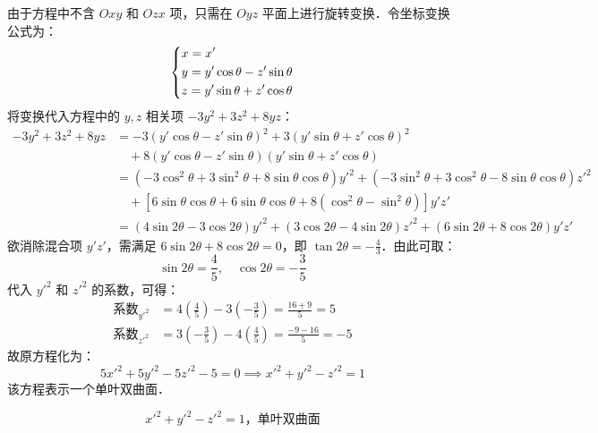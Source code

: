 \begin{solution}
    由于方程中不含 $Oxy$ 和 $Ozx$ 项，只需在 $Oyz$ 平面上进行旋转变换．令坐标变换公式为：
    \begin{equation}
        \begin{dcases}
            x = x'                              \\
            y = y' \cos \theta - z' \sin \theta \\
            z = y' \sin \theta + z' \cos \theta
        \end{dcases}
    \end{equation}
    将变换代入方程中的 $y, z$ 相关项 $-3y^2 + 3z^2 + 8yz$：
    \begin{equation}
        \begin{aligned}
            -3y^2 + 3z^2 + 8yz & = -3(y' \cos \theta - z' \sin \theta)^2 + 3(y' \sin \theta + z' \cos \theta)^2                                                            \\
                               & \quad + 8(y' \cos \theta - z' \sin \theta)(y' \sin \theta + z' \cos \theta)                                                               \\
                               & = (-3\cos^2 \theta + 3\sin^2 \theta + 8\sin \theta \cos \theta) y'^2 + (-3\sin^2 \theta + 3\cos^2 \theta - 8\sin \theta \cos \theta) z'^2 \\
                               & \quad + [6\sin \theta \cos \theta + 6\sin \theta \cos \theta + 8(\cos^2 \theta - \sin^2 \theta)] y'z'                                     \\
                               & = (4\sin 2\theta - 3\cos 2\theta) y'^2 + (3\cos 2\theta - 4\sin 2\theta) z'^2 + (6\sin 2\theta + 8\cos 2\theta) y'z'
        \end{aligned}
    \end{equation}
    欲消除混合项 $y'z'$，需满足 $6\sin 2\theta + 8\cos 2\theta = 0$，即 $\tan 2\theta = -\frac{4}{3}$．由此可取：
    \begin{equation}
        \sin 2\theta = \frac{4}{5}, \quad \cos 2\theta = -\frac{3}{5}
    \end{equation}
    代入 $y'^2$ 和 $z'^2$ 的系数，可得：
    \begin{equation}
        \begin{aligned}
            \text{系数}_{y'^2} & = 4 \left( \frac{4}{5} \right) - 3 \left( -\frac{3}{5} \right) = \frac{16 + 9}{5} = 5   \\
            \text{系数}_{z'^2} & = 3 \left( -\frac{3}{5} \right) - 4 \left( \frac{4}{5} \right) = \frac{-9 - 16}{5} = -5
        \end{aligned}
    \end{equation}
    故原方程化为：
    \begin{equation}
        5x'^2 + 5y'^2 - 5z'^2 - 5 = 0 \implies x'^2 + y'^2 - z'^2 = 1
    \end{equation}
    该方程表示一个单叶双曲面．

    \begin{equation}
        \boxed{x'^2 + y'^2 - z'^2 = 1，\text{单叶双曲面}}
    \end{equation}
\end{solution}


